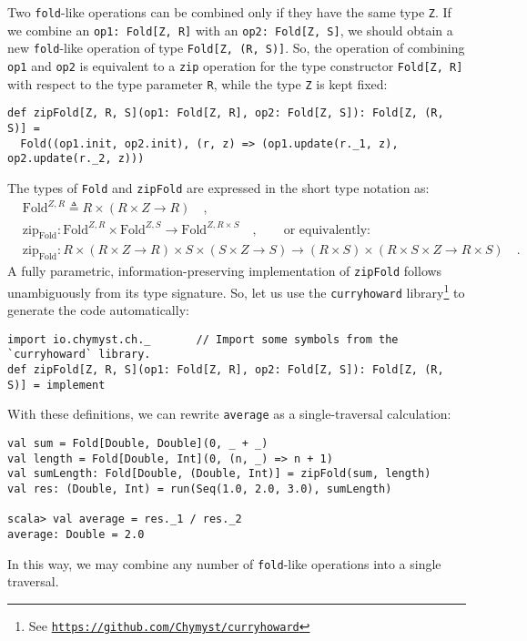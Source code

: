 Two \lstinline!fold!-like operations can be combined only if they
have the same type \lstinline!Z!. If we combine an \lstinline!op1: Fold[Z, R]!
with an \lstinline!op2: Fold[Z, S]!, we should obtain a new \lstinline!fold!-like
operation of type \lstinline!Fold[Z, (R, S)]!. So, the operation
of combining \lstinline!op1! and \lstinline!op2! is equivalent to
a \lstinline!zip! operation for the type constructor \lstinline!Fold[Z, R]!
with respect to the type parameter \lstinline!R!, while the type
\lstinline!Z! is kept fixed:
\begin{lstlisting}
def zipFold[Z, R, S](op1: Fold[Z, R], op2: Fold[Z, S]): Fold[Z, (R, S)] =
  Fold((op1.init, op2.init), (r, z) => (op1.update(r._1, z), op2.update(r._2, z)))
\end{lstlisting}

The types of \lstinline!Fold! and \lstinline!zipFold! are expressed
in the short type notation as:
\begin{align*}
 & \text{Fold}^{Z,R}\triangleq R\times\left(R\times Z\rightarrow R\right)\quad,\\
 & \text{zip}_{\text{Fold}}:\text{Fold}^{Z,R}\times\text{Fold}^{Z,S}\rightarrow\text{Fold}^{Z,R\times S}\quad,\quad\quad\text{or equivalently:}\\
 & \text{zip}_{\text{Fold}}:R\times\left(R\times Z\rightarrow R\right)\times S\times\left(S\times Z\rightarrow S\right)\rightarrow\left(R\times S\right)\times(R\times S\times Z\rightarrow R\times S)\quad.
\end{align*}
A fully parametric, information-preserving implementation of \lstinline!zipFold!
follows unambiguously from its type signature. So, let us use the
\lstinline!curryhoward! library\footnote{See \texttt{\href{https://github.com/Chymyst/curryhoward}{https://github.com/Chymyst/curryhoward}}}
to generate the code automatically:
\begin{lstlisting}
import io.chymyst.ch._       // Import some symbols from the `curryhoward` library.
def zipFold[Z, R, S](op1: Fold[Z, R], op2: Fold[Z, S]): Fold[Z, (R, S)] = implement
\end{lstlisting}

With these definitions, we can rewrite \lstinline!average! as a single-traversal
calculation:
\begin{lstlisting}
val sum = Fold[Double, Double](0, _ + _)
val length = Fold[Double, Int](0, (n, _) => n + 1)
val sumLength: Fold[Double, (Double, Int)] = zipFold(sum, length)
val res: (Double, Int) = run(Seq(1.0, 2.0, 3.0), sumLength)

scala> val average = res._1 / res._2
average: Double = 2.0
\end{lstlisting}
In this way, we may combine any number of \lstinline!fold!-like operations
into a single traversal. 

